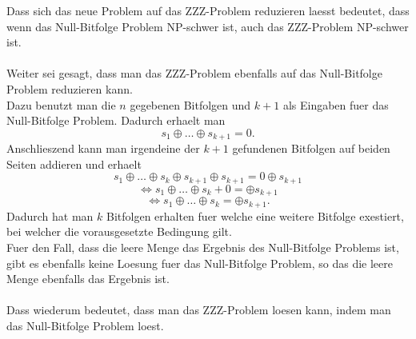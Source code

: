 \documentclass[a4paper,10pt,ngerman]{scrartcl}
\begin{document}
Dass sich das neue Problem auf das ZZZ-Problem reduzieren laesst bedeutet, dass wenn das Null-Bitfolge Problem NP-schwer ist, auch das ZZZ-Problem NP-schwer ist.
\\\\
Weiter sei gesagt, dass man das ZZZ-Problem ebenfalls auf das Null-Bitfolge Problem reduzieren kann. \\
Dazu benutzt man die $n$ gegebenen Bitfolgen und $k+1$ als Eingaben fuer das Null-Bitfolge Problem. Dadurch erhaelt man 
\[s_1 \oplus \dots \oplus s_{k+1} = 0. \] 
Anschlieszend kann man irgendeine der $k+1$ gefundenen Bitfolgen auf beiden Seiten addieren und erhaelt
\[s_1 \oplus \dots \oplus s_k \oplus s_{k+1} \oplus s_{k+1} = 0 \oplus s_{k+1} \] 
\[ \Leftrightarrow s_1 \oplus \dots \oplus s_{k} + 0 = \oplus s_{k+1} \] 
\[ \Leftrightarrow s_1 \oplus \dots \oplus s_{k} = \oplus s_{k+1}. \] 
Dadurch hat man $k$ Bitfolgen erhalten fuer welche eine weitere Bitfolge exestiert, bei welcher die vorausgesetzte Bedingung gilt.
\\Fuer den Fall, dass die leere Menge das Ergebnis des Null-Bitfolge Problems ist, gibt es ebenfalls keine Loesung fuer das Null-Bitfolge Problem, so das die leere Menge ebenfalls das Ergebnis ist.
\\\\
Dass wiederum bedeutet, dass man das ZZZ-Problem loesen kann, indem man das Null-Bitfolge Problem loest.
\end{document}

